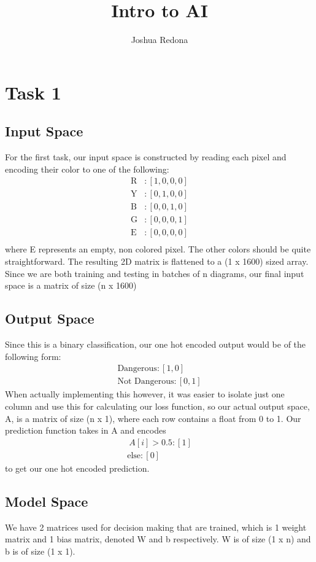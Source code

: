\documentclass[12pt]{article}
\title{Intro to AI}
\author{Joshua Redona}
\begin{document}
\maketitle

\section*{Task 1}
\subsection*{Input Space}
For the first task, our input space is constructed by reading each pixel and encoding their color to one of the 
following: 
\begin{align*}  
    \text{R} &: [1,0,0,0] \\
    \text{Y} &: [0,1,0,0] \\
    \text{B} &: [0,0,1,0] \\
    \text{G} &: [0,0,0,1] \\
    \text{E} &: [0,0,0,0] \\
\end{align*}    
where E represents an empty, non colored pixel. The other colors should be quite straightforward. The resulting 2D 
matrix is flattened to a (1 x 1600) sized array. Since we are both training and testing in batches of n diagrams, our final 
input space is a matrix of size (n x 1600) 

\subsection*{Output Space}
Since this is a binary classification, our one hot encoded output would be of the following form: 
\begin{align*}
    \text{Dangerous} : [1,0] \\
    \text{Not Dangerous} : [0,1]
\end{align*}
When actually implementing this however, it was easier to isolate just one column and use this for calculating 
our loss function, so our actual output space, A, is a matrix of size (n x 1), where each row contains a float from 0 to 1. 
Our prediction function takes in A and encodes
\begin{align*}\
    A[i] > 0.5 : [1] \\
    \text{else} : [0]
\end{align*}
to get our one hot encoded prediction. 

\subsection*{Model Space}
We have 2 matrices used for decision making that are trained, which is 1 weight matrix and 1 bias matrix, denoted W and b respectively. 
W is of size (1 x n) and b is of size (1 x 1). 
\end{document}
